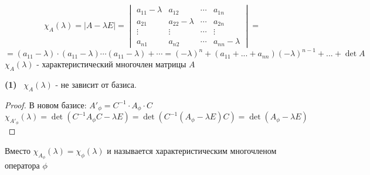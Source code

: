     \begin{definition}
        $$\chi_A(\lambda) = |A - \lambda E| = 
        \begin{vmatrix}
            a_{11} - \lambda & a_{12} & \cdots & a_{1n}\\
            a_{21} & a_{22} - \lambda & \cdots & a_{2n}\\
            \vdots & \vdots & \cdots & \vdots \\
            a_{n1} & a_{n2} & \cdots & a_{nn}-\lambda
        \end{vmatrix}= $$ 
         $$=(a_{11}-\lambda)\cdot(a_{11}-\lambda)\cdots(a_{11}-\lambda)+\cdots = (-\lambda)^n+(a_{11}+ ... + a_{nn})(-\lambda)^{n-1}+...+\det A$$
         $\chi_A(\lambda)$ - характеристический многочлен матрицы $A$
    \end{definition}
    \begin{subtheorem}\textbf{(1)} \ 
        $\chi_A(\lambda)$ - не зависит от базиса. 
    \end{subtheorem}
    \begin{proof}
        В новом базисе: $A'_\phi = C^{-1}\cdot A_\phi\cdot C$
        $$\chi_{A'_\phi}(\lambda) = \det (C^{-1} A_\phi C - \lambda E) = \det (C^{-1} (A_\phi - \lambda E)  C) = \det (A_\phi - \lambda E)$$ 
    \end{proof}
    \begin{definition}
        Вместо $\chi_{A_\phi}(\lambda) = \chi_\phi(\lambda)$ и называется характеристическим многочленом оператора $\phi$
    \end{definition}  